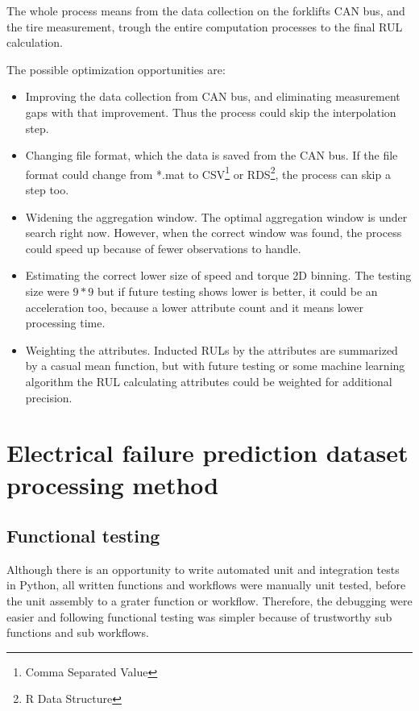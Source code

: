 The whole process means from the data collection on the forklifts CAN bus, and the tire measurement, trough the entire computation processes to the final RUL calculation.

The possible optimization opportunities are:
\begin{itemize}
	\item{Improving the data collection from CAN bus, and eliminating measurement gaps with that improvement.} Thus the process could skip the interpolation step. 
	\item{Changing file format, which the data is saved from the CAN bus.} If the file format could change from *.mat to CSV\footnote{Comma Separated Value} or RDS\footnote{R Data Structure}, the process can skip a step too.
	\item{Widening the aggregation window.} The optimal aggregation window is under search right now. However, when the correct window was found, the process could speed up because of fewer observations to handle.
	\item{Estimating the correct lower size of speed and torque 2D binning.} The testing size were $9*9$ but if future testing shows lower is better, it could be an acceleration too, because a lower attribute count and it means lower processing time.
	\item{Weighting the attributes.} Inducted RULs by the attributes are summarized by a casual mean function, but with future testing or some machine learning algorithm the RUL calculating attributes could be weighted for additional precision.
\end{itemize} 
\section{Electrical failure prediction dataset processing method}
\subsection{Functional testing}
Although there is an opportunity to write automated unit and integration tests in Python, all written functions and workflows were manually unit tested, before the unit assembly to a grater function or workflow. Therefore, the debugging were easier and following functional testing was simpler because of trustworthy sub functions and sub workflows.

